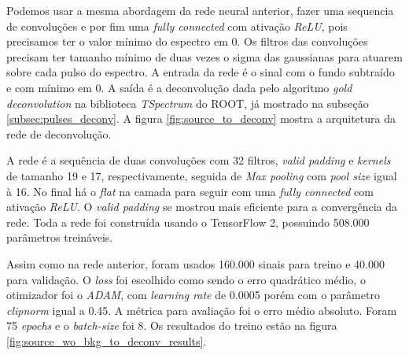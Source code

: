 \documentclass[a4paper,12pt,oneside]{book}
\begin{document}


\par Podemos usar a mesma abordagem da rede neural anterior, fazer uma sequencia de convoluções e por fim uma \textit{fully connected} com ativação \textit{ReLU}, pois precisamos ter o valor mínimo do espectro em 0. Os filtros das convoluções precisam ter tamanho mínimo de duas vezes o sigma das gaussianas para atuarem sobre cada pulso do espectro. A entrada da rede é o sinal com o fundo subtraído e com mínimo em 0. A saída é a deconvolução dada pelo algoritmo \textit{gold deconvolution} na biblioteca \textit{TSpectrum} do ROOT, já mostrado na subseção \ref{subsec:pulses_deconv}. A figura \ref{fig:source_to_deconv} mostra a arquitetura da rede de deconvolução.

\par A rede é a sequência de duas convoluções com 32 filtros, \textit{valid padding} e \textit{kernels} de tamanho 19 e 17, respectivamente, seguida de \textit{Max pooling} com \textit{pool size} igual à 16. No final há o \textit{flat} na camada para seguir com uma \textit{fully connected} com ativação \textit{ReLU}. O \textit{valid padding} se mostrou mais eficiente para a convergência da rede. Toda a rede foi construída usando o TensorFlow 2, possuindo 508.000 parâmetros treináveis.

\par Assim como na rede anterior, foram usados 160.000 sinais para treino e 40.000 para validação. O \textit{loss} foi escolhido como sendo o erro quadrático médio, o otimizador foi o \textit{ADAM}, com \textit{learning rate} de 0.0005 porém com o parâmetro \textit{clipnorm} igual a 0.45. A métrica para avaliação foi o erro médio absoluto. Foram 75 \textit{epochs} e o \textit{batch-size} foi 8. Os resultados do treino estão na figura \ref{fig:source_wo_bkg_to_deconv_results}.
\end{document}
